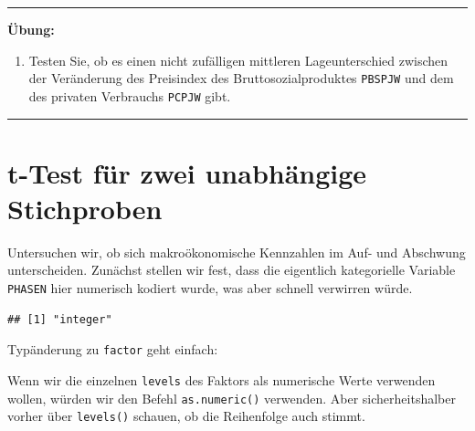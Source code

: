 \documentclass[12pt,ngerman,paper=a4,pagesize,DIV=13]{scrreprt}
\newenvironment{Shaded}{\begin{snugshade}}{\end{snugshade}}
\newcommand{\KeywordTok}[1]{\textcolor[rgb]{0.13,0.29,0.53}{\textbf{#1}}}
\newcommand{\NormalTok}[1]{#1}
\newcommand{\OperatorTok}[1]{\textcolor[rgb]{0.81,0.36,0.00}{\textbf{#1}}}
\newcommand{\StringTok}[1]{\textcolor[rgb]{0.31,0.60,0.02}{#1}}
\providecommand{\tightlist}{%
  \setlength{\itemsep}{0pt}\setlength{\parskip}{0pt}}
\begin{document}
\begin{center}\rule{0.5\linewidth}{\linethickness}\end{center}

\textbf{Übung:}

\begin{enumerate}
\def\labelenumi{\arabic{enumi}.}
\tightlist
\item
  Testen Sie, ob es einen nicht zufälligen mittleren Lageunterschied
  zwischen der Veränderung des Preisindex des Bruttosozialproduktes
  \texttt{PBSPJW} und dem des privaten Verbrauchs \texttt{PCPJW} gibt.
\end{enumerate}

\begin{center}\rule{0.5\linewidth}{\linethickness}\end{center}

\hypertarget{t-test-fur-zwei-unabhangige-stichproben}{%
\section{t-Test für zwei unabhängige
Stichproben}\label{t-test-fur-zwei-unabhangige-stichproben}}

Untersuchen wir, ob sich makroökonomische Kennzahlen im Auf- und
Abschwung unterscheiden. Zunächst stellen wir fest, dass die eigentlich
kategorielle Variable \texttt{PHASEN} hier numerisch kodiert wurde, was
aber schnell verwirren würde.

\begin{Shaded}
\end{Shaded}

\begin{verbatim}
## [1] "integer"
\end{verbatim}

Typänderung zu \texttt{factor} geht einfach:

\begin{Shaded}
\end{Shaded}

Wenn wir die einzelnen \texttt{levels} des Faktors als numerische Werte
verwenden wollen, würden wir den Befehl \texttt{as.numeric()} verwenden.
Aber sicherheitshalber vorher über \texttt{levels()} schauen, ob die
Reihenfolge auch stimmt.
\end{document}
